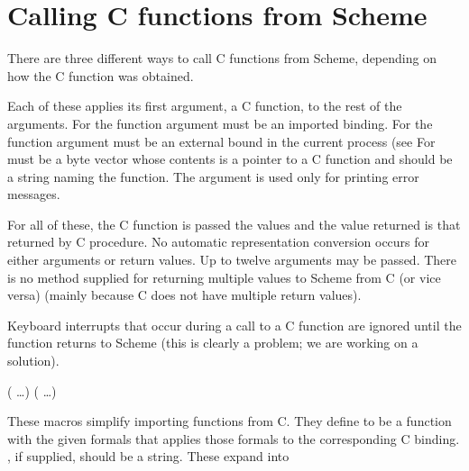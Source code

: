 \section{Calling C functions from Scheme}
\label{sec:external-call}

There are three different ways to call C functions from Scheme, depending on
 how the C function was obtained.

\begin{protos}
\end{protos}
\noindent
Each of these applies its first argument, a C function, to the rest of
 the arguments.
For  the function argument must be an
 imported binding.
For  the function argument must be an external
 bound in the current process
 (see
For   must be a byte vector
 whose contents is a pointer to a C function and  should be
 a string naming the function.
The  argument is used only for printing error messages.

For all of these, the C function is passed the  values
 and the value returned is that returned by C procedure.
No automatic representation conversion occurs for either arguments or
 return values.
Up to twelve arguments may be passed.
There is no method supplied for returning multiple values to
 Scheme from C (or vice versa) (mainly because C does not have multiple return
 values).

Keyboard interrupts that occur during a call to a C function are ignored
 until the function returns to Scheme (this is clearly a
 problem; we are working on a solution).

\begin{protos}
{  ( \ldots)}
{  ( \ldots)\ }
\end{protos}
\noindent{}These macros simplify importing functions from C.
They define  to be a function with the given formals that
 applies those formals to the corresponding C binding.
, if supplied, should be a string.
These expand into

